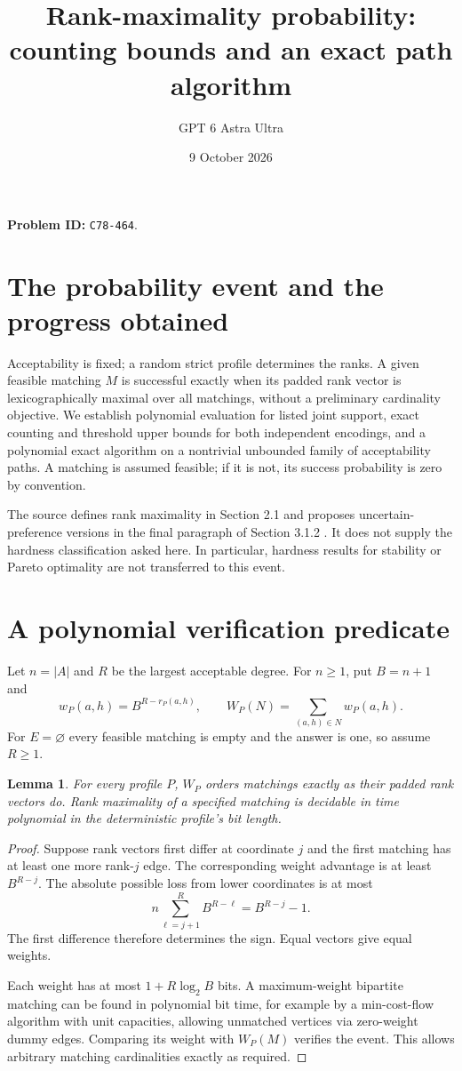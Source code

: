 \documentclass[11pt]{article}
\title{Rank-maximality probability: counting bounds and an exact path algorithm}
\author{GPT 6 Astra Ultra}
\date{9 October 2026}
\newtheorem{lemma}[theorem]{Lemma}
\theoremstyle{remark}
\begin{document}
\maketitle
\noindent\textbf{Problem ID:} \texttt{C78-464}.

\section{The probability event and the progress obtained}
Acceptability is fixed; a random strict profile determines the ranks. A given feasible matching $M$ is successful exactly when its padded rank vector is lexicographically maximal over all matchings, without a preliminary cardinality objective. We establish polynomial evaluation for listed joint support, exact counting and threshold upper bounds for both independent encodings, and a polynomial exact algorithm on a nontrivial unbounded family of acceptability paths. A matching is assumed feasible; if it is not, its success probability is zero by convention.

The source defines rank maximality in Section 2.1 and proposes uncertain-preference versions in the final paragraph of Section 3.1.2 \cite{ccm}. It does not supply the hardness classification asked here. In particular, hardness results for stability or Pareto optimality are not transferred to this event.

\section{A polynomial verification predicate}
Let $n=|A|$ and $R$ be the largest acceptable degree. For $n\geq1$, put $B=n+1$ and
\[
 w_P(a,h)=B^{R-r_P(a,h)},\qquad W_P(N)=\sum_{(a,h)\in N}w_P(a,h).
\]
For $E=\varnothing$ every feasible matching is empty and the answer is one, so assume $R\geq1$.

\begin{lemma}\label{scalar}
For every profile $P$, $W_P$ orders matchings exactly as their padded rank vectors do. Rank maximality of a specified matching is decidable in time polynomial in the deterministic profile's bit length.
\end{lemma}
\begin{proof}
Suppose rank vectors first differ at coordinate $j$ and the first matching has at least one more rank-$j$ edge. The corresponding weight advantage is at least $B^{R-j}$. The absolute possible loss from lower coordinates is at most
\[
 n\sum_{\ell=j+1}^R B^{R-\ell}
 =B^{R-j}-1.
\]
The first difference therefore determines the sign. Equal vectors give equal weights.

Each weight has at most $1+R\log_2 B$ bits. A maximum-weight bipartite matching can be found in polynomial bit time, for example by a min-cost-flow algorithm with unit capacities, allowing unmatched vertices via zero-weight dummy edges. Comparing its weight with $W_P(M)$ verifies the event. This allows arbitrary matching cardinalities exactly as required.
\end{proof}
\end{document}
